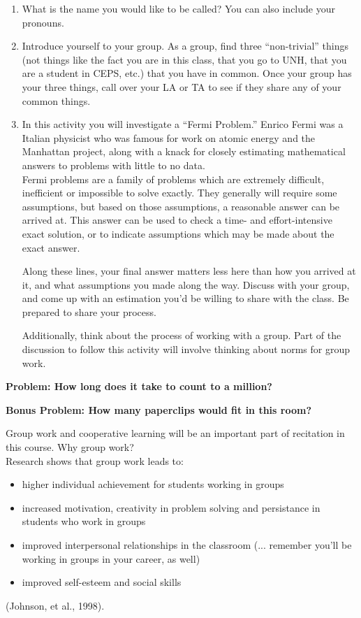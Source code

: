 \documentclass{ximera}
\begin{document}
\begin{enumerate}
    \item What is the name you would like to be called?  You can also include your pronouns.
    
    \item Introduce yourself to your group.  As a group, find three ``non-trivial'' things (not things like the fact you are in this class, that you go to UNH, that you are a student in CEPS, etc.) that you have in common.  Once your group has your three things, call over your LA or TA to see if they share any of your common things. \\
    \vspace{.5in}
    \item In this activity you will investigate a ``Fermi Problem.''  Enrico Fermi was a Italian physicist who was famous for work on atomic energy and the Manhattan project, along with a knack for closely estimating mathematical answers to problems with little to no data.\\
    Fermi problems are a family of problems which are extremely difficult, inefficient or impossible to solve exactly.  They generally will require some assumptions, but based on those assumptions, a reasonable answer can be arrived at. This answer can be used to check a time- and effort-intensive exact solution, or to indicate assumptions which may be made about the exact answer.  

    Along these lines, your final answer matters less here than how you arrived at it, and what assumptions you made along the way.  Discuss with your group, and come up with an estimation you'd be willing to share with the class.  Be prepared to share your process.  

    Additionally, think about the process of working with a group.  Part of the discussion to follow this activity will involve thinking about norms for group work.  
\end{enumerate}
\begin{exercise}
\textbf{Problem: How long does it take to count to a million?}
\end{exercise}

\begin{exercise}
    \textbf{Bonus Problem: How many paperclips would fit in this room?}
\end{exercise}

Group work and cooperative learning will be an important part of recitation in this course.  Why group work? \\
Research shows that group work leads to:
\begin{itemize}
    \item higher individual achievement for students working in groups
    \item increased motivation, creativity in problem solving and persistance in students who work in groups
    \item improved interpersonal relationships in the classroom (... remember you'll be working in groups in your career, as well)
    \item improved self-esteem and social skills
\end{itemize}
(Johnson, et al., 1998).\\
\end{document}
